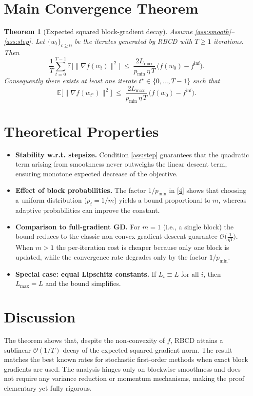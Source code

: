 \documentclass{article}
\newtheorem{theorem}{Theorem}
\newcommand{\E}{\mathbb{E}}
\begin{document}
\section*{Main Convergence Theorem}
\begin{theorem}[Expected squared block‑gradient decay]\label{thm:main}
Assume \ref{ass:smooth}–\ref{ass:step}.  Let $\{w_t\}_{t\ge0}$ be the
iterates generated by RBCD with $T\ge1$ iterations.  Then
\[
\frac{1}{T}\sum_{t=0}^{T-1}\E\!\big[\|\nabla f(w_t)\|^{2}\big]
\;\le\;
\frac{2L_{\max}}{p_{\min}\,\eta\,T}\,
\big(f(w_0)-f^{\inf}\big).
\tag{4}
\]
Consequently there exists at least one iterate $t^{\star}\in\{0,\dots,T-1\}$
such that
\[
\E\!\big[\|\nabla f(w_{t^{\star}})\|^{2}\big]
\;\le\;
\frac{2L_{\max}}{p_{\min}\,\eta\,T}\,
\big(f(w_0)-f^{\inf}\big).
\tag{5}
\]
\end{theorem}

\section*{Theoretical Properties}
\begin{itemize}[leftmargin=*]
\item \textbf{Stability w.r.t. stepsize.} Condition \eqref{ass:step} guarantees that the
quadratic term arising from smoothness never outweighs the linear descent term,
ensuring monotone expected decrease of the objective.
\item \textbf{Effect of block probabilities.} The factor $1/p_{\min}$ in \eqref{4} shows that
choosing a uniform distribution ($p_i=1/m$) yields a bound proportional to $m$,
whereas adaptive probabilities can improve the constant.
\item \textbf{Comparison to full‑gradient GD.} For $m=1$ (i.e., a single block) the bound reduces to the classic
non‑convex gradient‑descent guarantee
$\mathcal{O}\big(\frac{1}{\eta T}\big)$.  When $m>1$ the per‑iteration cost is cheaper
because only one block is updated, while the convergence rate degrades only by the factor $1/p_{\min}$.
\item \textbf{Special case: equal Lipschitz constants.} If $L_i\equiv L$ for all $i$, then $L_{\max}=L$ and the bound simplifies.
\end{itemize}

\section*{Discussion}
The theorem shows that, despite the non‑convexity of $f$, RBCD attains a
sublinear $\mathcal{O}(1/T)$ decay of the expected squared gradient norm.
The result matches the best known rates for stochastic first‑order methods
when exact block gradients are used.  The analysis hinges only on blockwise
smoothness and does not require any variance reduction or momentum
mechanisms, making the proof elementary yet fully rigorous.
\end{document}
